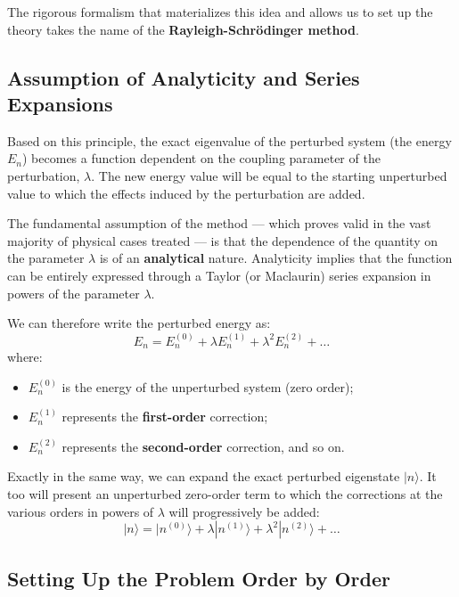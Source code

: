 The rigorous formalism that materializes this idea and allows us to set up the theory takes the name of the \textbf{Rayleigh-Schrödinger method}.

\subsection{Assumption of Analyticity and Series Expansions}
Based on this principle, the exact eigenvalue of the perturbed system (the energy $E_n$) becomes a function dependent on the coupling parameter of the perturbation, $\lambda$. The new energy value will be equal to the starting unperturbed value to which the effects induced by the perturbation are added.

The fundamental assumption of the method — which proves valid in the vast majority of physical cases treated — is that the dependence of the quantity on the parameter $\lambda$ is of an \textbf{analytical} nature. Analyticity implies that the function can be entirely expressed through a Taylor (or Maclaurin) series expansion in powers of the parameter $\lambda$.

We can therefore write the perturbed energy as:
\begin{equation}
E_n = E_n^{(0)} + \lambda E_n^{(1)} + \lambda^2 E_n^{(2)} + \dots
\end{equation}
where:
\begin{itemize}
\item $E_n^{(0)}$ is the energy of the unperturbed system (zero order);
\item $E_n^{(1)}$ represents the \textbf{first-order} correction;
\item $E_n^{(2)}$ represents the \textbf{second-order} correction, and so on.
\end{itemize}

Exactly in the same way, we can expand the exact perturbed eigenstate $\vert{}n\rangle$. It too will present an unperturbed zero-order term to which the corrections at the various orders in powers of $\lambda$ will progressively be added:
\begin{equation}
|n\rangle = |n^{(0)}\rangle + \lambda |n^{(1)}\rangle + \lambda^2 |n^{(2)}\rangle + \dots
\end{equation}

\subsection{Setting Up the Problem Order by Order}

